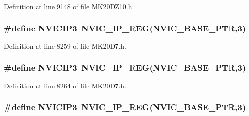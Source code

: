 Definition at line 9148 of file M\+K20\+D\+Z10.\+h.

\subsubsection[{\texorpdfstring{N\+V\+I\+C\+I\+P3}{NVICIP3}}]{\setlength{\rightskip}{0pt plus 5cm}\#define N\+V\+I\+C\+I\+P3~{\bf N\+V\+I\+C\+\_\+\+I\+P\+\_\+\+R\+EG}({\bf N\+V\+I\+C\+\_\+\+B\+A\+S\+E\+\_\+\+P\+TR},3)}\hypertarget{group___n_v_i_c___register___accessor___macros_gaa89b8db59062d0dda82c7e3e10c4b024}{}\label{group___n_v_i_c___register___accessor___macros_gaa89b8db59062d0dda82c7e3e10c4b024}


Definition at line 8259 of file M\+K20\+D7.\+h.

\subsubsection[{\texorpdfstring{N\+V\+I\+C\+I\+P3}{NVICIP3}}]{\setlength{\rightskip}{0pt plus 5cm}\#define N\+V\+I\+C\+I\+P3~{\bf N\+V\+I\+C\+\_\+\+I\+P\+\_\+\+R\+EG}({\bf N\+V\+I\+C\+\_\+\+B\+A\+S\+E\+\_\+\+P\+TR},3)}\hypertarget{group___n_v_i_c___register___accessor___macros_gaa89b8db59062d0dda82c7e3e10c4b024}{}\label{group___n_v_i_c___register___accessor___macros_gaa89b8db59062d0dda82c7e3e10c4b024}


Definition at line 8264 of file M\+K20\+D7.\+h.

\subsubsection[{\texorpdfstring{N\+V\+I\+C\+I\+P3}{NVICIP3}}]{\setlength{\rightskip}{0pt plus 5cm}\#define N\+V\+I\+C\+I\+P3~{\bf N\+V\+I\+C\+\_\+\+I\+P\+\_\+\+R\+EG}({\bf N\+V\+I\+C\+\_\+\+B\+A\+S\+E\+\_\+\+P\+TR},3)}\hypertarget{group___n_v_i_c___register___accessor___macros_gaa89b8db59062d0dda82c7e3e10c4b024}{}\label{group___n_v_i_c___register___accessor___macros_gaa89b8db59062d0dda82c7e3e10c4b024}


